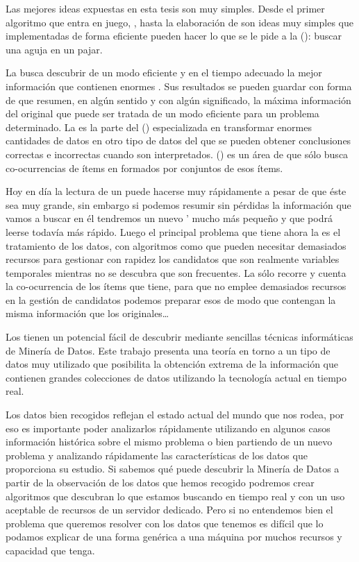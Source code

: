 \noindent Las mejores ideas expuestas en esta tesis son muy simples. Desde el primer algoritmo que entra en juego, \apriori, hasta la elaboración de \CCs son ideas muy simples que implementadas de forma eficiente pueden hacer lo que se le pide a la \emph{\dm} (\DM): buscar una aguja en un pajar.

La \DM busca descubrir de un modo eficiente y en el tiempo adecuado la mejor información que contienen enormes \datasets. Sus resultados se pueden guardar con forma de \datasets que resumen, en algún sentido y con algún significado, la máxima información del \dataset original que puede ser tratada de un modo eficiente para un problema determinado. La \DM es la parte del \kdd (\KDD) especializada en transformar enormes cantidades de datos en otro tipo de datos del que se pueden obtener conclusiones correctas e incorrectas cuando son interpretados. \arm (\ARM) es un área de \DM que sólo busca co-ocurrencias de ítems en \datasets formados por conjuntos de esos ítems.

Hoy en día la lectura de un \dataset \D puede hacerse muy rápidamente a pesar de que éste sea muy grande, sin embargo si podemos resumir sin pérdidas la información que vamos a buscar en él tendremos un nuevo \dataset \D' mucho más pequeño y que podrá leerse todavía más rápido. Luego el principal problema que tiene ahora la \ARM es el tratamiento de los datos, con algoritmos como \apriori que pueden necesitar demasiados recursos para gestionar con rapidez los candidatos que son realmente variables temporales mientras no se descubra que son frecuentes. La \ARM sólo recorre \datasets y cuenta la co-ocurrencia de los ítems que tiene, para que \apriori no emplee demasiados recursos en la gestión de candidatos podemos preparar esos \datasets de modo que contengan la misma información que los originales\ldots







\vspace{77pt}

Los \CCs tienen un potencial fácil de descubrir mediante sencillas técnicas informáticas de Minería de Datos. Este trabajo presenta una teoría en torno a un tipo de datos muy utilizado que posibilita la obtención extrema de la información que contienen grandes colecciones de datos utilizando la tecnología actual en tiempo real. 

Los datos bien recogidos reflejan el estado actual del mundo que nos rodea, por eso es importante poder analizarlos rápidamente utilizando en algunos casos información histórica sobre el mismo problema o bien partiendo de un nuevo problema y analizando rápidamente las características de los datos que proporciona su estudio. Si sabemos qué puede descubrir la Minería de Datos a partir de la observación de los datos que hemos recogido podremos crear algoritmos que descubran lo que estamos buscando en tiempo real y con un uso aceptable de recursos de un servidor dedicado. Pero si no entendemos bien el problema que queremos resolver con los datos que tenemos es difícil que lo podamos explicar de una forma genérica a una máquina por muchos recursos y capacidad que tenga.

